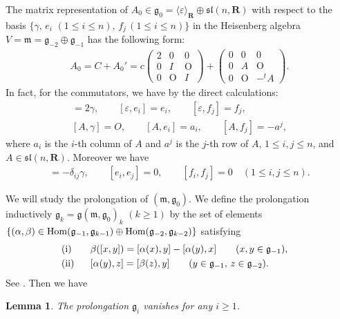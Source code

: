 \documentclass[11pt]{article}
\newtheorem{Lem}[Th]{Lemma}
{ \theoremstyle{definition}
\newtheorem{Def}[Th]{Definition}
\newtheorem{Rem}[Th]{Remark}
\newtheorem{Ex}[Th]{Example}}
\begin{document}
The matrix representation of $A_0 \in \mathfrak{g}_0=\langle\varepsilon\rangle_{{\mathbf{R}}} \oplus {\mathfrak{sl}}(n, {\mathbf{R}})$
with respect to the basis $\{ \gamma, \, e_i $ $(1 \leq i \leq n),\,   f_j\,  (1 \leq i \leq n) \}$ in
the Heisenberg algebra
$V= \mathfrak{m} = \mathfrak{g}_{-2}\oplus \mathfrak{g}_{-1}$
has the following form:
\begin{gather*}
A_0=C+A_0'=
 c
\begin{pmatrix}
2 & 0 & 0 \\
0 & I & \mathrm{O} \\
0 & \mathrm{O} & I
\end{pmatrix}
+
\begin{pmatrix}
0 & 0 & 0 \\
0 & A & \mathrm{O} \\
0 & \mathrm{O} & -{}^t\!A
\end{pmatrix}.
\end{gather*}
In fact, for the commutators, we have by the direct calculations:
\begin{gather*}
[\varepsilon, \gamma] = 2\gamma,
\qquad
[\varepsilon, e_i] = e_i,
\qquad
[\varepsilon, f_j] = f_j,
\\
[A, \gamma] = O,
\qquad
[A, e_i] = a_i,
\qquad
[A, f_j] = - a^j,
\end{gather*}
where $a_i$ is the $i$-th column of $A$ and $a^j$ is the $j$-th row of $A$,
$1 \leq i, j \leq n$, and $A \in {\mathfrak{sl}}(n, {\mathbf{R}})$.
Moreover we have
\begin{gather*}
[e_i, f_j] = - \delta_{ij}\gamma, \qquad [e_i, e_j] = 0, \qquad [f_i, f_j] = 0 \quad (1 \leq i, j \leq n).
\end{gather*}

We will study the prolongation of
$({\mathfrak m}, {\mathfrak g}_0)$.
We def\/ine the prolongation inductively
${\mathfrak g}_k = {\mathfrak g}({\mathfrak m}, {\mathfrak g}_0)_k$ $(k \geq 1)$ by
the set of elements
$\{
(\alpha, \beta) \in  {\rm Hom}({\mathfrak g}_{-1}, {\mathfrak g}_{k-1})\oplus
{\rm Hom}({\mathfrak g}_{-2}, {\mathfrak g}_{k-2})\}$ satisfying
\begin{alignat*}{3}
& {\rm (i)} \ \ && \beta([x, y]) = [\alpha(x), y] - [\alpha(y), x]   \qquad (x, y \in {\mathfrak g}_{-1}), &
\\
& {\rm (ii)} \ \ && [\alpha(y), z] = [\beta(z), y]  \qquad (y \in {\mathfrak g}_{-1},\, z \in {\mathfrak g}_{-2}).&
\end{alignat*}
See \cite[p.~429]{Y}. Then we have

\begin{Lem}
\label{prolongation-calculation}
The prolongation ${\mathfrak g}_i$ vanishes for any $i \geq 1$.
\end{Lem}
\end{document}
